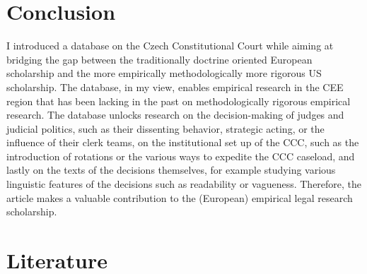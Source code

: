 \documentclass[
  11pt,
]{article}
\begin{document}
\section{Conclusion}\label{conclusion}

I introduced a database on the Czech Constitutional Court while aiming at bridging the gap between the traditionally doctrine oriented European scholarship and the more empirically methodologically more rigorous US scholarship. The database, in my view, enables empirical research in the CEE region that has been lacking in the past on methodologically rigorous empirical research. The database unlocks research on the decision-making of judges and judicial politics, such as their dissenting behavior, strategic acting, or the influence of their clerk teams, on the institutional set up of the CCC, such as the introduction of rotations or the various ways to expedite the CCC caseload, and lastly on the texts of the decisions themselves, for example studying various linguistic features of the decisions such as readability or vagueness. Therefore, the article makes a valuable contribution to the (European) empirical legal research scholarship.

\vspace{30pt}

\section*{Literature}\label{literature}
\end{document}
